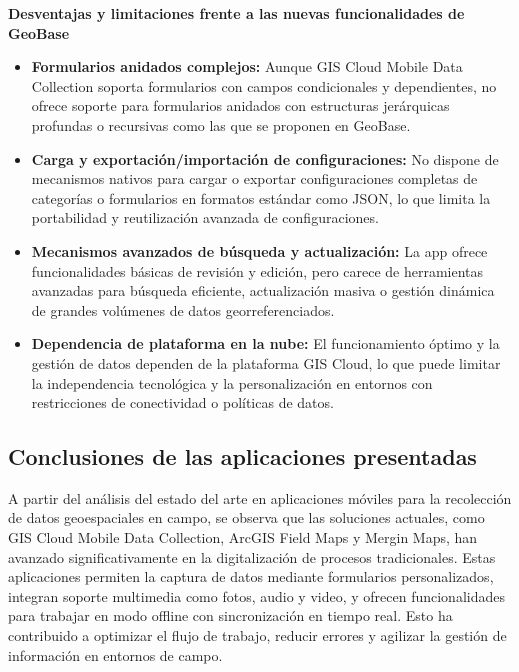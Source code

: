 \documentclass{article}
\begin{document}
\textbf{Desventajas y limitaciones frente a las nuevas funcionalidades de GeoBase}

\begin{itemize}
\item \textbf{Formularios anidados complejos:} Aunque GIS Cloud Mobile Data Collection soporta formularios con campos condicionales y dependientes, no ofrece soporte para formularios anidados con estructuras jerárquicas profundas o recursivas como las que se proponen en GeoBase.

\item \textbf{Carga y exportación/importación de configuraciones:} No dispone de mecanismos nativos para cargar o exportar configuraciones completas de categorías o formularios en formatos estándar como JSON, lo que limita la portabilidad y reutilización avanzada de configuraciones.

\item \textbf{Mecanismos avanzados de búsqueda y actualización:} La app ofrece funcionalidades básicas de revisión y edición, pero carece de herramientas avanzadas para búsqueda eficiente, actualización masiva o gestión dinámica de grandes volúmenes de datos georreferenciados.

\item \textbf{Dependencia de plataforma en la nube:} El funcionamiento óptimo y la gestión de datos dependen de la plataforma GIS Cloud, lo que puede limitar la independencia tecnológica y la personalización en entornos con restricciones de conectividad o políticas de datos.
\end{itemize}

\subsection{Conclusiones de las aplicaciones presentadas}

A partir del análisis del estado del arte en aplicaciones móviles para la recolección de datos geoespaciales en campo, se observa que las soluciones actuales, como GIS Cloud Mobile Data Collection, ArcGIS Field Maps y Mergin Maps, han avanzado significativamente en la digitalización de procesos tradicionales. Estas aplicaciones permiten la captura de datos mediante formularios personalizados, integran soporte multimedia como fotos, audio y video, y ofrecen funcionalidades para trabajar en modo offline con sincronización en tiempo real. Esto ha contribuido a optimizar el flujo de trabajo, reducir errores y agilizar la gestión de información en entornos de campo.
\end{document}

